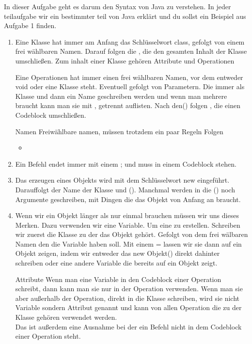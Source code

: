 
In dieser Aufgabe geht es darum den Syntax von Java zu verstehen.
In jeder teilaufgabe wir ein bestimmter teil von Java erklärt und du sollst ein Beispiel aus Aufgabe 1 finden.

\renewcommand{\theenumi}{\alph{enumi}}
\begin{enumerate}
    \item Eine Klasse hat immer am Anfang das Schlüsselwort class, gefolgt von einem frei wählbaren Namen. Darauf folgen die { }, die den gesamten Inhalt der Klasse umschließen.
    Zum inhalt einer Klasse gehören Attribute und Operationen

    Eine Operationen hat immer einen frei wählbaren Namen, vor dem entweder void oder eine Klasse steht. Eventuell gefolgt von Parametern. Die immer als Klasse und dann ein Name geschreiben werden und wenn man mehrere braucht kann man sie mit , getrennt auflisten.
    Nach den() folgen {}, die einen Codeblock umschließen.
    \begin{Infobox}{Namen}
        Freiwählbare namen, müssen trotzdem ein paar Regeln Folgen
        \begin{itemize}
            \item 
        \end{itemize}
    \end{Infobox}
    \item Ein Befehl endet immer mit einem ; und muss in einem Codeblock stehen.
    \item Das erzeugen eines Objekts wird mit dem Schlüsselwort new eingeführt. Darauffolgt der Name der Klasse und (). Manchmal werden in die () noch Argumente geschreiben, mit Dingen die das Objekt von Anfang an braucht.
    \item Wenn wir ein Objekt länger als nur einmal brauchen müssen wir uns dieses Merken. Dazu verwenden wir eine Variable. Um eine zu erstellen. Schreiben wir zuerst die Klasse zu der das Objekt gehört. Gefolgt von dem frei wälbaren Namen den die Variable haben soll. Mit einem = lassen wir sie dann auf ein Objekt zeigen, indem wir entweder das new Objekt() direkt dahinter schreiben oder eine andere 
    Variable die bereits auf ein Objekt zeigt.
    \begin{Infobox}{Attribute}
        Wenn man eine Variable in den Codeblock einer Operation schreibt, dann kann man sie nur in der Operation verwenden.
        Wenn man sie aber außerhalb der Operation, direkt in die Klasse schreiben, wird sie nicht Variable sondern Attribut genannt und kann von allen Operation die zu der Klasse gehören verwendet werden.\\
        Das ist außerdem eine Ausnahme bei der ein Befehl nicht in dem Codeblock einer Operation steht.
    \end{Infobox}
    
\end{enumerate}
